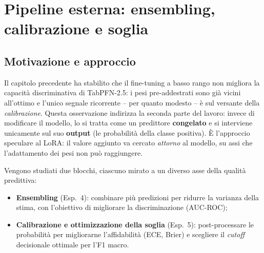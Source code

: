 %

\section{Pipeline esterna: ensembling, calibrazione e soglia}
\label{sec:pipeline}

\subsection{Motivazione e approccio}
Il capitolo precedente ha stabilito che il fine-tuning a basso rango non
migliora la capacità discriminativa di TabPFN-2.5: i pesi pre-addestrati sono
già vicini all'ottimo e l'unico segnale ricorrente -- per quanto modesto -- è
sul versante della \emph{calibrazione}. Questa osservazione indirizza la
seconda parte del lavoro: invece di modificare il modello, lo si tratta come un
predittore \textbf{congelato} e si interviene unicamente sul suo
\textbf{output} (le probabilità della classe positiva). È l'approccio speculare
al LoRA: il valore aggiunto va cercato \emph{attorno} al modello, su assi che
l'adattamento dei pesi non può raggiungere.

Vengono studiati due blocchi, ciascuno mirato a un diverso asse della qualità
predittiva:
\begin{itemize}[nosep]
  \item \textbf{Ensembling} (Esp.~4): combinare più predizioni per ridurre la
  varianza della stima, con l'obiettivo di migliorare la discriminazione
  (AUC-ROC);
  \item \textbf{Calibrazione e ottimizzazione della soglia} (Esp.~5):
  post-processare le probabilità per migliorarne l'affidabilità (ECE, Brier) e
  scegliere il \emph{cutoff} decisionale ottimale per l'F1 macro.
\end{itemize}

